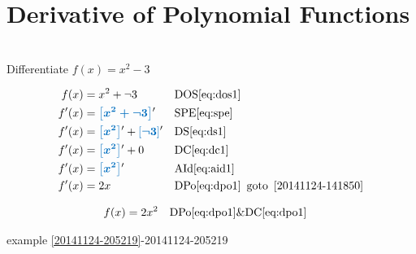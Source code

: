 \documentclass[20150903-160354-rs2.2-MarksMathNotebook.tex]{subfiles}
\begin{document}
\section{Derivative of Polynomial Functions}



\begin{example}[id:20141124-152503] \label{20141124-152503} \hfill \\

Differentiate $f(x)=x^2-3$

\soln

\solnsteps
\begin{align*}
f(x) &= x^2 + \neg 3 && \text{DOS} \eqref{eq:dos1} \\
f'(x) &= \farg{x^2 + \neg 3}' && \text{SPE} \eqref{eq:spe} \\
f'(x) &= \farg{x^2}' + \farg{\neg 3}' && \text{DS} \eqref{eq:ds1} \\
f'(x) &= \farg{x^2}' + 0 && \text{DC} \eqref{eq:dc1} \\
f'(x) &= \farg{x^2}' && \text{AId} \eqref{eq:aid1} \\
f'(x) &= 2x && \text{DPo} \eqref{eq:dpo1}  \text{\, goto \,}  \ref{20141124-141850}
\end{align*}

\soln

\lesssteps

\begin{align*}
f(x) & = 2x^2 && \text{DPo} \eqref{eq:dpo1} \& \text{DC} \eqref{eq:dpo1}
\end{align*}

\qdepend

\qdependlist

example \ref{20141124-205219}-20141124-205219

\end{example}
\end{document}

